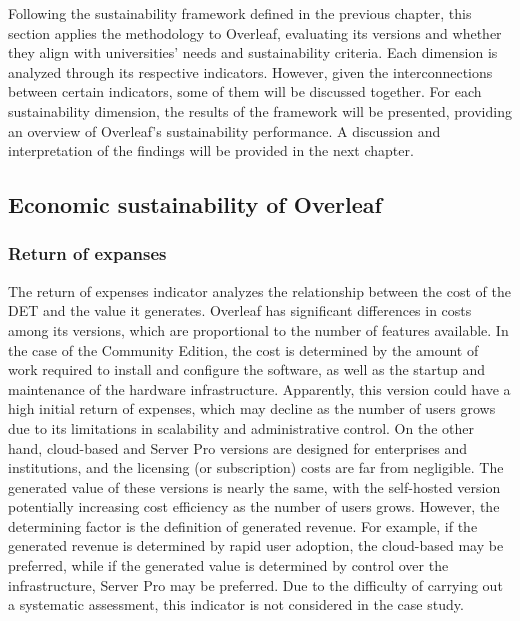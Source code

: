 Following the sustainability framework defined in the previous chapter, this section applies the methodology to Overleaf, evaluating its versions and whether they align with universities' needs and sustainability criteria. Each dimension is analyzed through its respective indicators. However, given the interconnections between certain indicators, some of them will be discussed together.
For each sustainability dimension, the results of the framework will be presented, providing an overview of Overleaf’s sustainability performance. A discussion and interpretation of the findings will be provided in the next chapter.

\bigskip

\subsection{Economic sustainability of Overleaf}
\label{subsec:overleaf-economic}
\medskip

\subsubsection{Return of expanses}
The return of expenses indicator analyzes the relationship between the cost of the DET and the value it generates. Overleaf has significant differences in costs among its versions, which are proportional to the number of features available. In the case of the Community Edition, the cost is determined by the amount of work required to install and configure the software, as well as the startup and maintenance of the hardware infrastructure. Apparently, this version could have a high initial return of expenses, which may decline as the number of users grows due to its limitations in scalability and administrative control. On the other hand, cloud-based and Server Pro versions are designed for enterprises and institutions, and the licensing (or subscription) costs are far from negligible. The generated value of these versions is nearly the same, with the self-hosted version potentially increasing cost efficiency as the number of users grows. However, the determining factor is the definition of generated revenue. For example, if the generated revenue is determined by rapid user adoption, the cloud-based may be preferred, while if the generated value is determined by control over the infrastructure, Server Pro may be preferred. Due to the difficulty of carrying out a systematic assessment, this indicator is not considered in the case study. 

